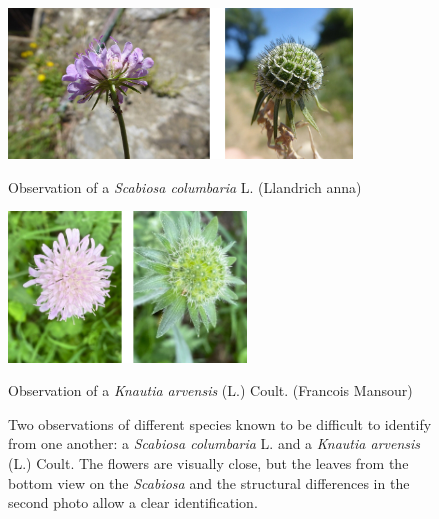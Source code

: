 \begin{figure}[tbh]
    \centering
    \begin{minipage}[b]{0.45\textwidth}
        \centering
        \includegraphics[width=\textwidth,height=4cm]{./images_plantnet/scabiosa.jpg}
        \caption*{Observation of a \emph{Scabiosa columbaria} L. (\textcopyright Llandrich anna)}
    \end{minipage}
    \hfill
    \begin{minipage}[b]{0.45\textwidth}
        \centering
        \includegraphics[width=\textwidth,height=4cm]{./images_plantnet/knautia.jpg}
        \caption*{Observation of a \emph{Knautia arvensis} (L.) Coult. (\textcopyright Francois Mansour)}
    \end{minipage}
    \caption{Two observations of different species known to be difficult to identify from one another: a \emph{Scabiosa columbaria} L. and a \emph{Knautia arvensis} (L.) Coult. The flowers are visually close, but the leaves from the bottom view on the \emph{Scabiosa} and the structural differences in the second photo allow a clear identification.}
    \label{fig:scabiosa-knautia}
\end{figure}

